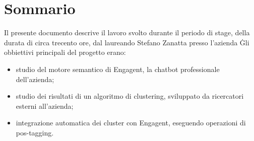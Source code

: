 
\cleardoublepage
{}
{}
\begingroup
\let\clearpage\relax
\let\cleardoublepage\relax
\let\cleardoublepage\relax

\chapter*{Sommario}

Il presente documento descrive il lavoro svolto durante il periodo di stage, della durata di circa trecento ore, dal laureando Stefano Zanatta presso l'azienda \company\.
Gli obbiettivi principali del progetto erano:
\begin{itemize}
    \item studio del motore semantico di Engagent, la chatbot professionale dell'azienda;
    \item studio dei risultati di un algoritmo di clustering, sviluppato da ricercatori esterni all'azienda;
    \item integrazione automatica dei cluster con Engagent, eseguendo operazioni di pos-tagging.
\end{itemize}

%
%

\endgroup			

\vfill

